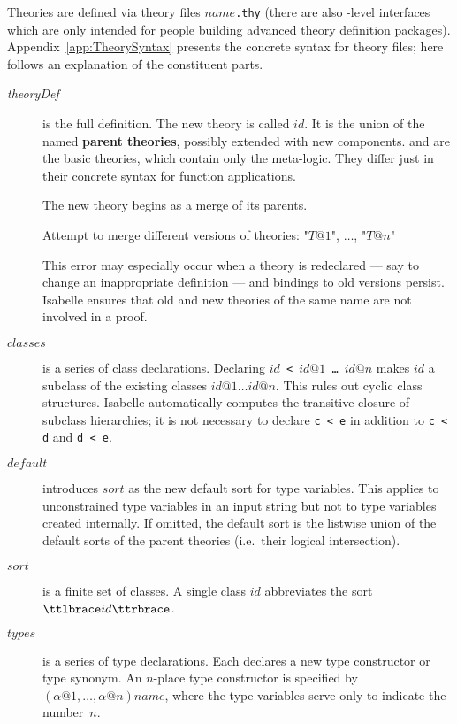 Theories are defined via theory files $name$\texttt{.thy} (there are also
\ML-level interfaces which are only intended for people building advanced
theory definition packages).  Appendix~\ref{app:TheorySyntax} presents the
concrete syntax for theory files; here follows an explanation of the
constituent parts.
\begin{description}
\item[{\it theoryDef}] is the full definition.  The new theory is called $id$.
  It is the union of the named {\bf parent
    theories}, possibly extended with new
  components.   and  are the basic theories, which
  contain only the meta-logic.  They differ just in their concrete syntax for
  function applications.
  
  The new theory begins as a merge of its parents.
  \begin{ttbox}
    Attempt to merge different versions of theories: "\(T@1\)", \(\ldots\), "\(T@n\)"
  \end{ttbox}
  This error may especially occur when a theory is redeclared --- say to
  change an inappropriate definition --- and bindings to old versions persist.
  Isabelle ensures that old and new theories of the same name are not involved
  in a proof.

\item[$classes$]
  is a series of class declarations.  Declaring {\tt$id$ < $id@1$ \dots\
    $id@n$} makes $id$ a subclass of the existing classes $id@1\dots
  id@n$.  This rules out cyclic class structures.  Isabelle automatically
  computes the transitive closure of subclass hierarchies; it is not
  necessary to declare {\tt c < e} in addition to {\tt c < d} and {\tt d <
    e}.

\item[$default$]
  introduces $sort$ as the new default sort for type variables.  This applies
  to unconstrained type variables in an input string but not to type
  variables created internally.  If omitted, the default sort is the listwise
  union of the default sorts of the parent theories (i.e.\ their logical
  intersection).
  
\item[$sort$] is a finite set of classes.  A single class $id$
  abbreviates the sort $\ttlbrace id\ttrbrace$.

\item[$types$]
  is a series of type declarations.  Each declares a new type constructor
  or type synonym.  An $n$-place type constructor is specified by
  $(\alpha@1,\dots,\alpha@n)name$, where the type variables serve only to
  indicate the number~$n$.


\end{description}
